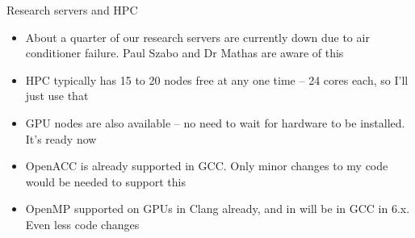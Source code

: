 \documentclass{beamer}
\begin{document}
\begin{frame}{Research servers and HPC}
\begin{itemize}
\item About a quarter of our research servers are currently down due to air conditioner failure.
			Paul Szabo and Dr	Mathas are aware of this
\item HPC typically has 15 to 20 nodes free at any one time -- 24 cores each, so I'll just use that
\item GPU nodes are also available -- no need to wait for hardware to be installed. It's ready now
\item OpenACC is already supported in GCC. Only minor changes to my code would be needed to support this
\item OpenMP supported on GPUs in Clang already, and in will be in GCC in 6.x. Even less code changes
\end{itemize}
\end{frame}
\end{document}
